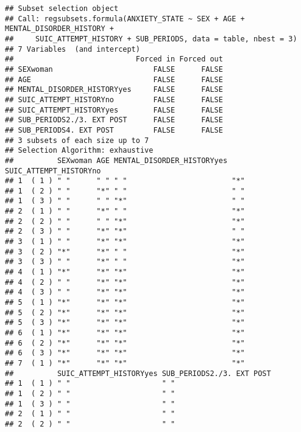 \documentclass[
]{book}
\begin{document}
\begin{verbatim}
## Subset selection object
## Call: regsubsets.formula(ANXIETY_STATE ~ SEX + AGE + MENTAL_DISORDER_HISTORY + 
##     SUIC_ATTEMPT_HISTORY + SUB_PERIODS, data = table, nbest = 3)
## 7 Variables  (and intercept)
##                            Forced in Forced out
## SEXwoman                       FALSE      FALSE
## AGE                            FALSE      FALSE
## MENTAL_DISORDER_HISTORYyes     FALSE      FALSE
## SUIC_ATTEMPT_HISTORYno         FALSE      FALSE
## SUIC_ATTEMPT_HISTORYyes        FALSE      FALSE
## SUB_PERIODS2./3. EXT POST      FALSE      FALSE
## SUB_PERIODS4. EXT POST         FALSE      FALSE
## 3 subsets of each size up to 7
## Selection Algorithm: exhaustive
##          SEXwoman AGE MENTAL_DISORDER_HISTORYyes SUIC_ATTEMPT_HISTORYno
## 1  ( 1 ) " "      " " " "                        "*"                   
## 1  ( 2 ) " "      "*" " "                        " "                   
## 1  ( 3 ) " "      " " "*"                        " "                   
## 2  ( 1 ) " "      "*" " "                        "*"                   
## 2  ( 2 ) " "      " " "*"                        "*"                   
## 2  ( 3 ) " "      "*" "*"                        " "                   
## 3  ( 1 ) " "      "*" "*"                        "*"                   
## 3  ( 2 ) "*"      "*" " "                        "*"                   
## 3  ( 3 ) " "      "*" " "                        "*"                   
## 4  ( 1 ) "*"      "*" "*"                        "*"                   
## 4  ( 2 ) " "      "*" "*"                        "*"                   
## 4  ( 3 ) " "      "*" "*"                        "*"                   
## 5  ( 1 ) "*"      "*" "*"                        "*"                   
## 5  ( 2 ) "*"      "*" "*"                        "*"                   
## 5  ( 3 ) "*"      "*" "*"                        "*"                   
## 6  ( 1 ) "*"      "*" "*"                        "*"                   
## 6  ( 2 ) "*"      "*" "*"                        "*"                   
## 6  ( 3 ) "*"      "*" "*"                        "*"                   
## 7  ( 1 ) "*"      "*" "*"                        "*"                   
##          SUIC_ATTEMPT_HISTORYyes SUB_PERIODS2./3. EXT POST
## 1  ( 1 ) " "                     " "                      
## 1  ( 2 ) " "                     " "                      
## 1  ( 3 ) " "                     " "                      
## 2  ( 1 ) " "                     " "                      
## 2  ( 2 ) " "                     " "                      

\end{verbatim}
\end{document}

